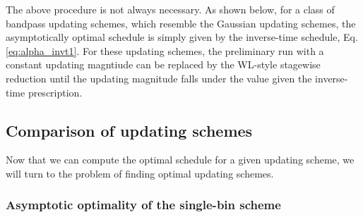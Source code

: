 \documentclass[reprint, superscriptaddress, floatfix]{revtex4-1}
\begin{document}
The above procedure is not always necessary.
%
As shown below, for a class of bandpass updating schemes,
  which resemble the Gaussian updating schemes,
  the asymptotically optimal schedule
  is simply given by the inverse-time schedule, Eq. \eqref{eq:alpha_invt1}.
%
For these updating schemes,
  the preliminary run with a constant updating magntiude
  can be replaced by the WL-style stagewise reduction
  until the updating magnitude falls under
  the value given the inverse-time prescription\cite{
    belardinelli2007, *belardinelli2007jcp, *belardinelli2008, *belardinelli2016}.



\subsection{\label{sec:cmpschemes}
Comparison of updating schemes}


Now that we can compute the optimal schedule
for a given updating scheme,
we will turn to the problem of finding
optimal updating schemes.


\subsubsection{\label{sec:optWL}
Asymptotic optimality of the single-bin scheme}
\end{document}
